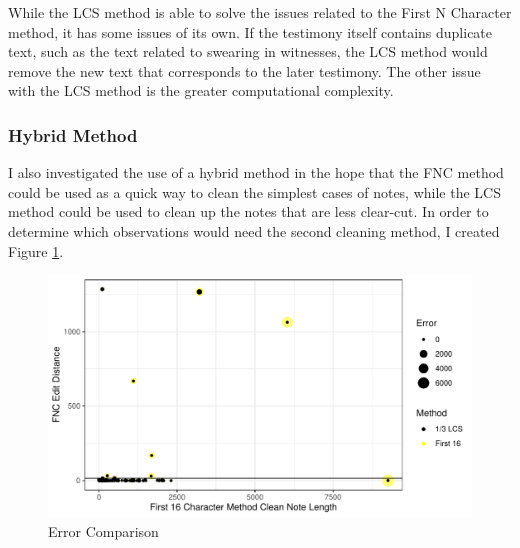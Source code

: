 \documentclass[print]{nuthesis}
\begin{document}
While the LCS method is able to solve the issues related to the First N Character method, it has some issues of its own.
If the testimony itself contains duplicate text, such as the text related to swearing in witnesses, the LCS method would remove the new text that corresponds to the later testimony.
The other issue with the LCS method is the greater computational complexity.

\hypertarget{hybrid-method}{%
\subsubsection{Hybrid Method}\label{hybrid-method}}

I also investigated the use of a hybrid method in the hope that the FNC method could be used as a quick way to clean the simplest cases of notes, while the LCS method could be used to clean up the notes that are less clear-cut.
In order to determine which observations would need the second cleaning method, I created Figure \ref{fig:errorplot}.

\begin{figure}

{\centering \includegraphics[width=\linewidth]{thesis_files/figure-latex/errorplot-1} 

}

\caption{Error Comparison}\label{fig:errorplot}
\end{figure}
\end{document}

